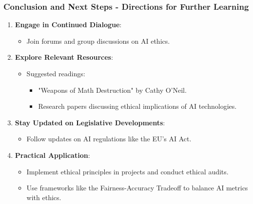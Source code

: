 \documentclass[aspectratio=169]{beamer}
\begin{document}
\begin{frame}[fragile]
    \frametitle{Conclusion and Next Steps - Directions for Further Learning}

    \begin{enumerate}
        \item \textbf{Engage in Continued Dialogue}:
        \begin{itemize}
            \item Join forums and group discussions on AI ethics.
        \end{itemize}

        \item \textbf{Explore Relevant Resources}:
        \begin{itemize}
            \item Suggested readings: 
            \begin{itemize}
                \item "Weapons of Math Destruction" by Cathy O'Neil.
                \item Research papers discussing ethical implications of AI technologies.
            \end{itemize}
        \end{itemize}

        \item \textbf{Stay Updated on Legislative Developments}:
        \begin{itemize}
            \item Follow updates on AI regulations like the EU's AI Act.
        \end{itemize}

        \item \textbf{Practical Application}:
        \begin{itemize}
            \item Implement ethical principles in projects and conduct ethical audits.
            \item Use frameworks like the Fairness-Accuracy Tradeoff to balance AI metrics with ethics.
        \end{itemize}
    \end{enumerate}
\end{frame}
\end{document}
